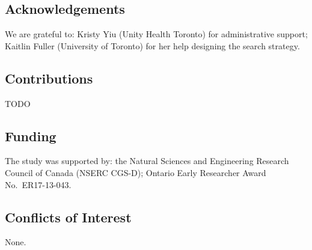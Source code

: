 \subsection*{Acknowledgements}
We are grateful to:
Kristy Yiu (Unity Health Toronto) for administrative support;
Kaitlin Fuller (University of Toronto) for her help designing the search strategy.
\subsection*{Contributions}
TODO
\subsection*{Funding}
The study was supported by:
the Natural Sciences and Engineering Research Council of Canada (NSERC CGS-D);
Ontario Early Researcher Award No.\ ER17-13-043. %
\subsection*{Conflicts of Interest}
None.